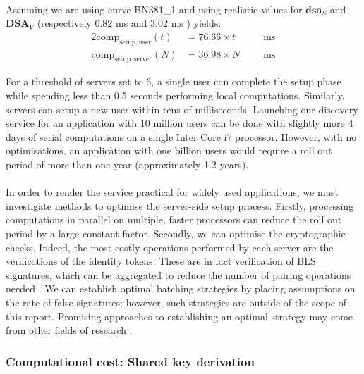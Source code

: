 	\paragraph{} Assuming we are using curve BN381\_1 and using realistic values for $\mathbf{dsa}_S$ and $\mathbf{DSA}_V$ (respectively $0.82$ ms and $3.02$ ms \cite{WolfSSl}) yields:
	\begin{alignat}{2}
		\mathrm{comp}_{\mathrm{setup, user}}(t) &= 76.66 \times t  \qquad &\mathrm{ms} \\
		\mathrm{comp}_{\mathrm{setup, server}}(N) &= 36.98\times N &\mathrm{ms}
	\end{alignat}
	
	\noindent For a threshold of servers set to $6$, a single user can complete the setup phase while spending less than 0.5 seconds performing local computations. Similarly, servers can setup a new user within tens of milliseconds. Launching our discovery service for an application with 10 million users can be done with slightly more 4 days of serial computations on a single Inter Core i7 processor. However, with no optimisations, an application with one billion users would require a roll out period of more than one year (approximately 1.2 years).
	
	\paragraph{} In order to render the service practical for widely used applications, we must investigate methods to optimise the server-side setup process. Firstly, processing computations in parallel on multiple, faster processors can reduce the roll out period by a large constant factor. Secondly, we can optimise the cryptographic checks. Indeed, the most costly operations performed by each server are the verifications of the identity tokens. These are in fact verification of BLS signatures, which can be aggregated to reduce the number of pairing operations needed \cite{BLSagg}. We can establish optimal batching strategies by placing assumptions on the rate of false signatures; however, such strategies are outside of the scope of this report. Promising approaches to establishing an optimal strategy may come from other fields of research \cite{covid}. 
	
	\subsubsection{Computational cost: Shared key derivation}
	
